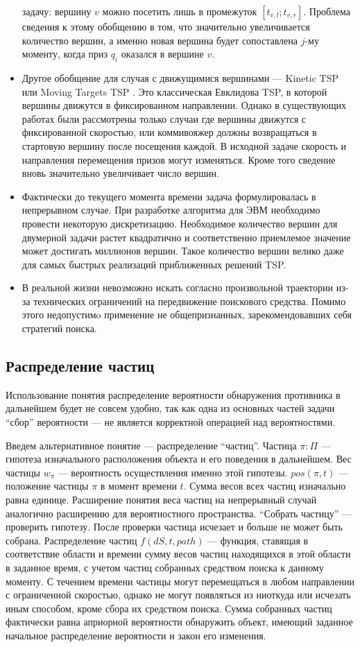 \begin{itemize}
{задачу: вершину $v$ можно посетить лишь в промежуток $[t_{v,l}; t_{v,r}]$. Проблема сведения к
этому обобщению
в том, что значительно увеличивается количество вершин, а именно новая вершина будет
сопоставлена $j$-му моменту, когда приз $q_i$ оказался в вершине $v$.} 
\item{Другое обобщение для случая с движущимися вершинами --- Kinetic TSP \cite{ham99} или
Moving Targets TSP \cite{hel03}.
Это классическая Евклидова TSP, в которой вершины движутся в фиксированном направлении.
Однако в существующих работах были рассмотрены только случаи где вершины движутся с
фиксированной скоростью, или коммивояжер должны возвращаться в стартовую вершину
 после посещения каждой. В исходной
задаче скорость и направления перемещения призов могут изменяться. Кроме того сведение вновь
значительно увеличивает число вершин.}
\item{Фактически до текущего момента времени задача формулировалась в непрерывном случае.
При разработке алгоритма для ЭВМ необходимо провести некоторую дискретизацию.
Необходимое количество вершин для двумерной задачи растет квадратично и соответственно
приемлемое значение может достигать миллионов вершин. Такое количество вершин велико
даже для самых быстрых реализаций приближенных решений TSP.}
\item{В реальной жизни невозможно искать согласно произвольной траектории из-за технических
ограничений на передвижение поискового средства. Помимо этого недопустимo применение не
общепризнанных, зарекомендовавших себя стратегий поиска.}
\end{itemize}

\FloatBarrier
\subsection{Распределение частиц}
Использование понятия распределение вероятности обнаружения противника в дальнейшем будет
не совсем удобно, так как одна из основных частей задачи ``сбор'' вероятности --- не является
корректной операцией над вероятностями.

Введем альтернативное понятие --- распределение ``частиц''.
Частица $\pi : \Pi$ --- гипотеза изначального расположения объекта и его поведения в дальнейшем.
Вес частицы $w_{\pi}$ --- вероятность осуществления именно этой гипотезы.
$pos(\pi, t)$ --- положение частицы $\pi$ в момент времени $t$.
Сумма весов всех частиц изначально равна единице. Расширение понятия веса частиц на непрерывный
 случай аналогично расширению для вероятностного пространства.
``Собрать частицу'' --- проверить гипотезу. После проверки частица исчезает и больше не может
быть собрана.
Распределение частиц $f(dS, t, path)$ --- функция, ставящая в соответствие области и
 времени сумму весов частиц находящихся в этой области в заданное время,
 с учетом частиц собранных средством поиска к данному моменту. 
С течением времени частицы могут перемещаться в любом направлении с ограниченной скоростью, однако
не могут появляться из ниоткуда или исчезать иным способом, кроме сбора их средством поиска.
Сумма собранных частиц фактически равна априорной вероятности обнаружить объект, имеющий заданное
начальное распределение вероятности и закон его изменения.

